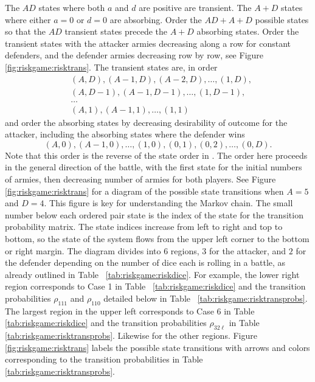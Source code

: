 \documentclass[12pt]{article}
\begin{document}
The \( AD \) states where both \( a \) and \( d \) are positive are
transient.  The \( A + D \) states where either \( a = 0 \) or \( d = 0 \)
are absorbing.  Order the \( AD + A + D \) possible states so that the \(
AD \) transient states precede the \( A + D \) absorbing states. Order
the transient states with the attacker armies decreasing along a row for
constant defenders, and the defender armies decreasing row by row, see
Figure~%
\ref{fig:riskgame:risktrans}.  The transient states are, in order
\begin{align*}
    & (A, D), (A-1, D), (A-2, D), \dots, (1, D), \\
        & (A, D-1), (A-1, D-1), \dots, (1, D-1), \\
        & \dots \\
        & (A, 1), (A-1, 1), \dots, (1,1)
\end{align*}
and order the absorbing states by decreasing desirability of outcome for
the attacker, including the absorbing states where the defender wins
\[
    (A, 0), (A-1, 0),\dots, (1, 0), (0, 1), (0, 2),\dots, (0, D).
\] Note that this order is the reverse of the state order in
\cite{osborne03}.  The order here proceeds in the general direction of
the battle, with the first state for the initial numbers of armies, then
decreasing number of armies for both players.  See Figure~%
\ref{fig:riskgame:risktrans} for a diagram of the possible state
transitions when \( A = 5 \) and \( D = 4 \).  This figure is key for
understanding the Markov chain.  The small number below each ordered
pair state is the index of the state for the transition probability
matrix.  The state indices increase from left to right and top to
bottom, so the state of the system flows from the upper left corner to
the bottom or right margin.  The diagram divides into \( 6 \) regions, \(
3 \) for the attacker, and \( 2 \) for the defender depending on the
number of dice each is rolling in a battle, as already outlined in
Table~%
\ref{tab:riskgame:riskdice}.  For example, the lower right region
corresponds to Case 1 in Table~%
\ref{tab:riskgame:riskdice} and the transition probabilities \( \rho_{111}
\) and \( \rho_{110} \) detailed below in Table~%
\ref{tab:riskgame:risktransprobs}.  The largest region in the upper left
corresponds to Case 6 in Table~%
\ref{tab:riskgame:riskdice} and the transition probabilities \( \rho_{32\ell}
\) in Table~%
\ref{tab:riskgame:risktransprobs}.  Likewise for the other regions.
Figure~%
\ref{fig:riskgame:risktrans} labels the possible state transitions with
arrows and colors corresponding to the transition probabilities in
Table~%
\ref{tab:riskgame:risktransprobs}.
\end{document}
